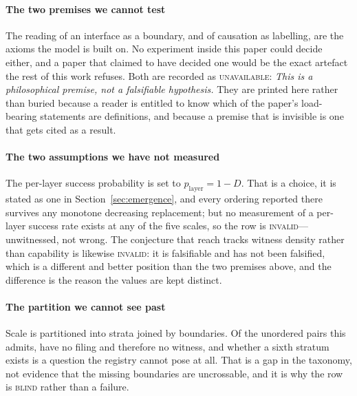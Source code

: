 \documentclass[conference]{IEEEtran}
\theoremstyle{definition}
\begin{document}
\begin{table}[h!]
\centering
\caption{Self-audit of this paper. Each claim was graded with the same lattice the
paper applies to other people's filings, against the evidence channel in the last
column. A \textsc{pass} means the manuscript's arithmetic recomputes, not that the
claim is true of nature; an \textsc{invalid} means no witness was offered, not that
the claim is false.}
\label{tab:selfaudit}
\footnotesize

\end{table}

\paragraph{The two premises we cannot test} The reading of an interface as a
boundary, and of causation as labelling, are the axioms the model is built on. No
experiment inside this paper could decide either, and a paper that claimed to have
decided one would be the exact artefact the rest of this work refuses. Both are
recorded as \textsc{unavailable}: \emph{This is a philosophical premise, not a
falsifiable hypothesis.} They are printed here rather than buried because a reader
is entitled to know which of the paper's load-bearing statements are definitions,
and because a premise that is invisible is one that gets cited as a result.

\paragraph{The two assumptions we have not measured} The per-layer success
probability is set to $p_{\text{layer}}=1-D$. That is a choice, it is stated as one
in Section~\ref{sec:emergence}, and every ordering reported there survives any
monotone decreasing replacement; but no measurement of a per-layer success rate
exists at any of the five scales, so the row is \textsc{invalid}---unwitnessed, not
wrong. The conjecture that reach tracks witness density rather than capability is
likewise \textsc{invalid}: it is falsifiable and has not been falsified, which is a
different and better position than the two premises above, and the difference is
the reason the values are kept distinct.

\paragraph{The partition we cannot see past} Scale is partitioned into
\saStrataCount{} strata joined by \saEdgeCount{} boundaries. Of the
\saPairCount{} unordered pairs this admits, \saUnwitnessedCount{} have no filing
and therefore no witness, and whether a sixth stratum exists is a question the
registry cannot pose at all. That is a gap in the taxonomy, not evidence that the
missing boundaries are uncrossable, and it is why the row is \textsc{blind} rather
than a failure.
\end{document}
